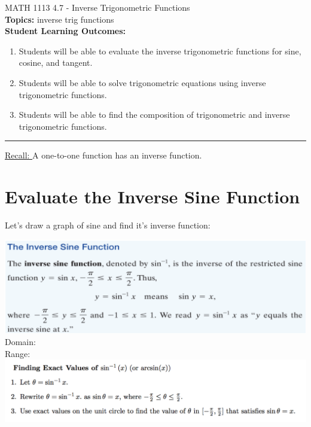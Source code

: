 \documentclass[11pt]{article}
\begin{document}
\noindent MATH 1113   \hfill 4.7 - Inverse Trigonometric Functions\\



\noindent \textbf{Topics:}  inverse trig functions\\

\noindent \textbf{Student Learning Outcomes:}
\begin{enumerate}
\item Students will be able to evaluate the inverse trigonometric functions for sine, cosine, and tangent.
\item Students will be able to solve trigonometric equations using inverse trigonometric functions.
\item Students will be able to find the composition of trigonometric and inverse trigonometric functions.
\end{enumerate}

\hrule 
\vspace{5mm}
\noindent \underline{Recall:  } A one-to-one function has an inverse function.
\section{Evaluate the Inverse Sine Function}

Let's draw a graph of sine and find it's inverse function:
\vfill

\includegraphics[scale=.7]{sineinverse}\\
\noindent Domain:\\[.5in]
\noindent Range:\\

\newpage
\includegraphics[scale=.7]{findingsineinverse}\\
\end{document}
